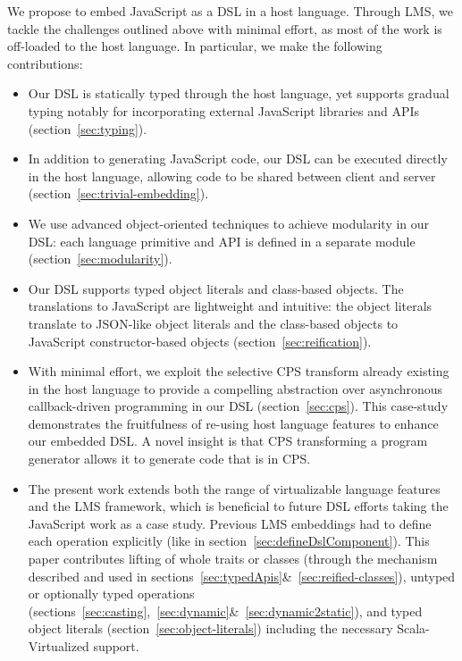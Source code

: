 \documentclass[runningheads,a4paper]{llncs}
\begin{document}
We propose to embed JavaScript as a DSL in a host language. Through LMS, we tackle the challenges outlined above with minimal effort, as most of the work is off-loaded to the host language. In particular, we make the following contributions:
\begin{itemize}
\item Our DSL is statically typed through the host language, yet supports gradual typing notably for incorporating external JavaScript libraries and APIs (section~\ref{sec:typing}).
\item In addition to generating JavaScript code, our DSL can be executed directly in the host language, allowing code to be shared between client and server (section~\ref{sec:trivial-embedding}).
\item We use advanced object-oriented techniques to achieve modularity in our DSL: each language primitive and API is defined in a separate module (section~\ref{sec:modularity}).
\item Our DSL supports typed object literals and class-based objects. The translations to JavaScript are lightweight and intuitive: the object literals translate to JSON-like object literals and the class-based objects to JavaScript constructor-based objects (section~\ref{sec:reification}).
\item With minimal effort, we exploit the selective CPS transform already existing in the host language to provide a compelling abstraction over asynchronous callback-driven programming in our DSL (section~\ref{sec:cps}). This case-study demonstrates the fruitfulness of re-using host language features to enhance our embedded DSL. A novel insight is that CPS transforming a program generator allows it to generate code that is in CPS.
\item The present work extends both the range of virtualizable language features and the LMS framework, which is beneficial to future DSL efforts taking the JavaScript work as a case study. Previous LMS embeddings had to define each operation explicitly (like in section~\ref{sec:defineDslComponent}). This paper contributes lifting of whole traits or classes (through the  mechanism described and used in sections~\ref{sec:typedApis}\&~\ref{sec:reified-classes}), untyped or optionally typed operations (sections~\ref{sec:casting},~\ref{sec:dynamic}\&~\ref{sec:dynamic2static}), and typed object literals (section~\ref{sec:object-literals}) including the necessary Scala-Virtualized support.
\end{itemize}
\end{document}
